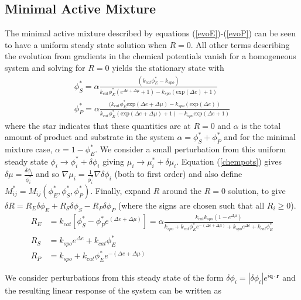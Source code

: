 \subsection{Minimal Active Mixture}
The minimal active mixture described by equations (\ref{evoE})-(\ref{evoP}) can be seen to have a uniform steady state solution when $R=0$. All other terms describing the evolution from gradients in the chemical potentials vanish for a homogeneous system and solving for $R=0$ yields the stationary state with
\begin{align}
    \phi_S^* = \alpha\frac{(k_{cat}\phi_E^*-k_{spo})}{k_{cat}\phi_E^*(e^{\Delta e + \Delta\mu}+1) - k_{spo}(\text{exp} (\Delta e)+1)} \label{sstar}
    \\
    \phi_P^* = \alpha\frac{(k_{cat}\phi_E^*\text{exp} (\Delta e + \Delta\mu) - k_{spo}(\text{exp} (\Delta e))}{k_{cat}\phi_E^*(\text{exp} (\Delta e + \Delta\mu)+1) - k_{spo}\text{exp} (\Delta e+1)} 
    \label{pstar}
\end{align}
where the star indicates that these quantities are at $R=0$ and $\alpha$ is the total amount of product and substrate in the system $\alpha = \phi_S^*+\phi_P^*$ and for the minimal mixture case, $\alpha = 1-\phi_E^*$. We consider a small perturbation from this uniform steady state $\phi_i \rightarrow \phi_i^* + \delta\phi_i$ giving $\mu_i \rightarrow \mu_i^* + \delta\mu_i$. Equation (\ref{chempots}) gives $\delta\mu = \frac{\delta\phi_i}{\phi_i^*}$ and so $\nabla\mu_i = \frac{1}{\phi_i^*}\nabla\delta\phi_i$ (both to first order) and also define $M^*_{ij} = M_{ij}(\phi_E^*, \phi_S^*, \phi_P^*)$. Finally, expand $R$ around the $R=0$ solution, to give $\delta R = R_E\delta\phi_E+R_S\delta\phi_S-R_P\delta\phi_P$ (where the signs are chosen such that all $R_i \geq 0$).
\begin{align}
    R_E &= k_{cat}[\phi_S^*-\phi_P^*e^{(\Delta e + \Delta \mu)}] = \alpha\frac{k_{cat}k_{spo}(1-e^{\Delta \mu})}{k_{spo}+k_{cat}\phi_E^*e^{-(\Delta e + \Delta \mu)}+k_{spo}e^{\Delta e}+k_{cat}\phi_E^*}\\
    R_S &= k_{spo}e^{\Delta e} + k_{cat}\phi_E^*\\
    R_P &= k_{spo} + k_{cat}\phi_E^*e^{-(\Delta e+\Delta \mu)}
\end{align}

We consider perturbations from this steady state of the form $\delta\phi_i = |\delta\phi_i| e^{i\textbf{q}\cdot\textbf{r}}$ and the resulting linear response of the system can be written as

